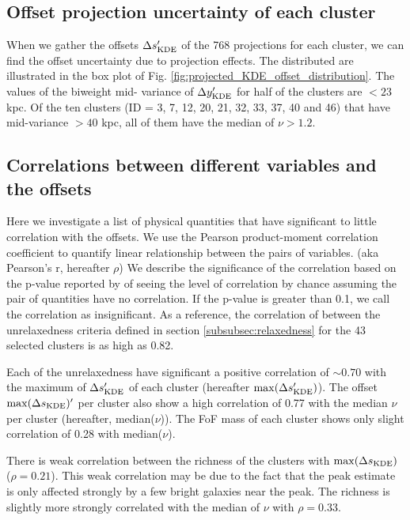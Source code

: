 \subsection{Offset projection uncertainty of each cluster}
When we gather the offsets $\Delta s_{\rm KDE}'$ of the 
768 projections for each cluster,
we can find the offset uncertainty due to projection effects.
The distributed are illustrated in the box plot of Fig. 
\ref{fig:projected_KDE_offset_distribution}. The values of the biweight mid-
variance of $\Delta y_{\rm KDE}'$ for half of the clusters
are $< 23$ kpc. Of the ten clusters (ID = 3, 7, 12, 20, 21, 32, 33, 37, 40 and 46) 
that have mid-variance $ > 40$ kpc, all of them have the median of $\nu > 1.2$.
 
\subsection{Correlations between different variables and the offsets}

Here we investigate a list of physical quantities that have significant to little
correlation with the offsets. 
We use the Pearson product-moment correlation coefficient to quantify linear 
relationship between the pairs of variables. 
(aka Pearson's r,  hereafter $\rho$)
We describe the significance of the correlation 
based on the p-value reported by {} of seeing the level of 
correlation by chance assuming the pair of 
quantities have no correlation. If the p-value is greater than 0.1, we call the
correlation as insignificant.
As a reference, the correlation of between the 
unrelaxedness criteria defined in section \ref{subsubsec:relaxedness}
for the 43 selected clusters is as high as 0.82. 

Each of the unrelaxedness have significant a positive correlation of $\sim 0.70$
with the maximum of $\Delta s_{\rm KDE}'$ of each cluster
(hereafter $\max(\Delta s_{\rm KDE}')$).
The offset $\max(\Delta s_{\rm KDE})'$ per cluster also show a high
correlation of 0.77 with the median $\nu$ per cluster (hereafter,
median($\nu$)). The FoF mass of each cluster shows only slight correlation of 0.28 with 
 median($\nu$).

There is weak correlation between the richness of the
clusters with $\max(\Delta s_{\rm KDE})$ ($\rho = 0.21$). This weak correlation 
may be due to 
the fact that the peak estimate is only affected strongly by a few bright galaxies near 
the peak. The richness is slightly more strongly correlated with the median of $\nu$ 
with $\rho = 0.33$. 

